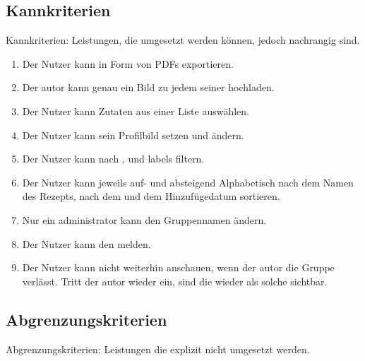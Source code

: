 \documentclass[parskip=full]{scrartcl}
\begin{document}
\subsection{Kannkriterien}
Kannkriterien: Leistungen, die umgesetzt werden können, jedoch nachrangig sind.

\begin{enumerate}[start=1,label={$\langle$\bfseries RC\arabic*$\rangle$}, leftmargin = 5em, itemsep=4pt, parsep=4pt]
    \item Der Nutzer kann  in Form von PDFs exportieren.\label{rc:PDFExport}
    \item Der \Gls{autor} kann genau ein Bild zu jedem seiner  hochladen.\label{rc:Images}
    \item Der Nutzer kann Zutaten aus einer Liste auswählen.\label{rc:IngredientList}
    \item Der Nutzer kann sein Profilbild setzen und ändern.\label{rc:ProfileImage}
    \item Der Nutzer kann  nach ,  und \Gls{labels} filtern.\label{rc:Filtering}
    \item Der Nutzer kann  jeweils auf- und absteigend Alphabetisch nach dem Namen des Rezepts, nach dem  und dem Hinzufügedatum sortieren.\label{rc:Sorting}
    \item Nur ein \Gls{administrator} kann den Gruppennamen ändern.\label{rc:GroupRenaming}
    \item Der Nutzer kann den   melden.\label{rc:RecipeMelden}
    \item Der Nutzer kann   nicht weiterhin anschauen, wenn der \gls{autor} die Gruppe verlässt. Tritt der \gls{autor} wieder ein, sind die   wieder als solche sichtbar.\label{rc:FavoriteAuthorRejoin}

\end{enumerate}

\subsection{Abgrenzungskriterien}
Abgrenzungskriterien: Leistungen die explizit nicht umgesetzt werden.
\end{document}
